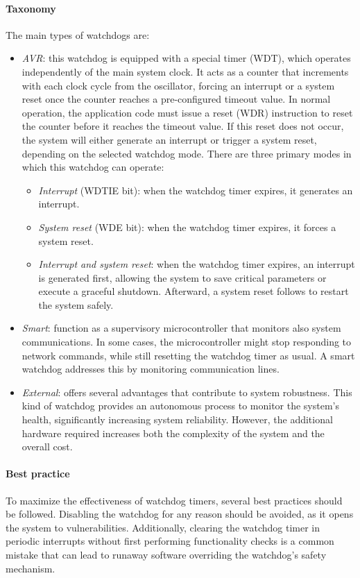 \paragraph*{Taxonomy}
The main types of watchdogs are: 
\begin{itemize}
    \item \textit{AVR}: this watchdog is equipped with a special timer (WDT), which operates independently of the main system clock. 
        It acts as a counter that increments with each clock cycle from the oscillator, forcing an interrupt or a system reset once the counter reaches a pre-configured timeout value. 
        In normal operation, the application code must issue a reset (WDR) instruction to reset the counter before it reaches the timeout value.
        If this reset does not occur, the system will either generate an interrupt or trigger a system reset, depending on the selected watchdog mode.
        There are three primary modes in which this watchdog can operate:
        \begin{itemize}
            \item \textit{Interrupt} (WDTIE bit): when the watchdog timer expires, it generates an interrupt. 
            \item \textit{System reset} (WDE bit): when the watchdog timer expires, it forces a system reset. 
            \item \textit{Interrupt and system reset}: when the watchdog timer expires, an interrupt is generated first, allowing the system to save critical parameters or execute a graceful shutdown. 
                Afterward, a system reset follows to restart the system safely. 
        \end{itemize}
    \item \textit{Smart}: function as a supervisory microcontroller that monitors also system communications.
        In some cases, the microcontroller might stop responding to network commands, while still resetting the watchdog timer as usual.
        A smart watchdog addresses this by monitoring communication lines. 
    \item \textit{External}: offers several advantages that contribute to system robustness.
        This kind of watchdog provides an autonomous process to monitor the system's health, significantly increasing system reliability.
        However, the additional hardware required increases both the complexity of the system and the overall cost.
\end{itemize}

\paragraph*{Best practice}
To maximize the effectiveness of watchdog timers, several best practices should be followed. 
Disabling the watchdog for any reason should be avoided, as it opens the system to vulnerabilities. 
Additionally, clearing the watchdog timer in periodic interrupts without first performing functionality checks is a common mistake that can lead to runaway software overriding the watchdog's safety mechanism.

